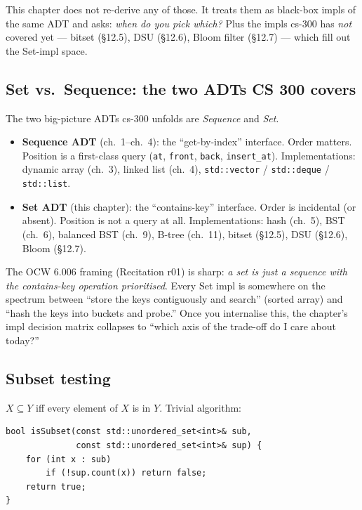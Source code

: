 \documentclass[11pt]{article}
\begin{document}
This chapter does not re-derive any of those. It treats them as
black-box impls of the same ADT and asks: \emph{when do you pick
which?} Plus the impls cs-300 has \emph{not} covered yet --- bitset
(\S12.5), DSU (\S12.6), Bloom filter (\S12.7) --- which fill out the
Set-impl space.

\subsection*{Set vs.\ Sequence: the two ADTs CS 300 covers}

\begin{notebox}
The two big-picture ADTs cs-300 unfolds are \emph{Sequence} and
\emph{Set}.

\begin{itemize}[leftmargin=*]
    \item \textbf{Sequence ADT} (ch.~1--ch.~4): the ``get-by-index''
          interface. Order matters. Position is a first-class
          query (\texttt{at}, \texttt{front}, \texttt{back},
          \texttt{insert\_at}). Implementations: dynamic array
          (ch.~3), linked list (ch.~4), \texttt{std::vector} /
          \texttt{std::deque} / \texttt{std::list}.
    \item \textbf{Set ADT} (this chapter): the ``contains-key''
          interface. Order is incidental (or absent). Position is
          not a query at all. Implementations: hash (ch.~5), BST
          (ch.~6), balanced BST (ch.~9), B-tree (ch.~11), bitset
          (\S12.5), DSU (\S12.6), Bloom (\S12.7).
\end{itemize}

The OCW 6.006 framing (Recitation r01) is sharp: \emph{a set is just
a sequence with the contains-key operation prioritised}. Every Set
impl is somewhere on the spectrum between ``store the keys
contiguously and search'' (sorted array) and ``hash the keys into
buckets and probe.'' Once you internalise this, the chapter's impl
decision matrix collapses to ``which axis of the trade-off do I
care about today?''
\end{notebox}

\subsection*{Subset testing}

$X \subseteq Y$ iff every element of $X$ is in $Y$. Trivial algorithm:

\begin{lstlisting}[basicstyle=\ttfamily\small,frame=single]
bool isSubset(const std::unordered_set<int>& sub,
              const std::unordered_set<int>& sup) {
    for (int x : sub)
        if (!sup.count(x)) return false;
    return true;
}
\end{lstlisting}
\end{document}
